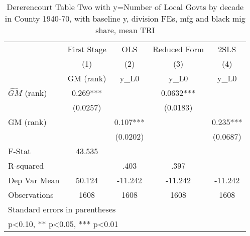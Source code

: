 \begin{table}[htbp]\centering
\def\sym#1{\ifmmode^{#1}\else\(^{#1}\)\fi}
\caption{Dererencourt Table Two with y=Number of Local Govts by decade in County 1940-70, with baseline y, division FEs, mfg and black mig share, mean TRI}
\begin{tabular}{l*{4}{c}}
\toprule
                    & First Stage   &         OLS   &Reduced Form   &        2SLS   \\
                    &\multicolumn{1}{c}{(1)}&\multicolumn{1}{c}{(2)}&\multicolumn{1}{c}{(3)}&\multicolumn{1}{c}{(4)}\\
                    &\multicolumn{1}{c}{GM  (rank)}&\multicolumn{1}{c}{y\_L0}&\multicolumn{1}{c}{y\_L0}&\multicolumn{1}{c}{y\_L0}\\
\midrule
$\hat{GM}$ (rank)   &       0.269***&               &      0.0632***&               \\
                    &    (0.0257)   &               &    (0.0183)   &               \\
\addlinespace
GM  (rank)          &               &       0.107***&               &       0.235***\\
                    &               &    (0.0202)   &               &    (0.0687)   \\
\midrule
F-Stat              &      43.535   &               &               &               \\
R-squared           &               &        .403   &        .397   &               \\
Dep Var Mean        &      50.124   &     -11.242   &     -11.242   &     -11.242   \\
Observations        &        1608   &        1608   &        1608   &        1608   \\
\bottomrule
\multicolumn{5}{l}{\footnotesize Standard errors in parentheses}\\
\multicolumn{5}{l}{\footnotesize * p<0.10, ** p<0.05, *** p<0.01}\\
\end{tabular}
\end{table}
